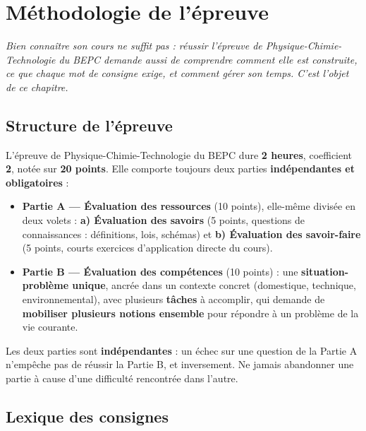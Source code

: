 \chapter{Méthodologie de l'épreuve}

\noindent\textit{Bien connaître son cours ne suffit pas : réussir l'épreuve de
Physique-Chimie-Technologie du BEPC demande aussi de comprendre comment elle est
construite, ce que chaque mot de consigne exige, et comment gérer son temps. C'est l'objet
de ce chapitre.}
\vspace{8pt}

\section{Structure de l'épreuve}

\begin{propriete}
L'épreuve de Physique-Chimie-Technologie du BEPC dure \textbf{2 heures}, coefficient
\textbf{2}, notée sur \textbf{20 points}. Elle comporte toujours deux parties
\textbf{indépendantes et obligatoires} :
\begin{itemize}
\item \textbf{Partie A — Évaluation des ressources} (10 points), elle-même divisée en
deux volets : \textbf{a) Évaluation des savoirs} (5 points, questions de connaissances :
définitions, lois, schémas) et \textbf{b) Évaluation des savoir-faire} (5 points, courts
exercices d'application directe du cours).
\item \textbf{Partie B — Évaluation des compétences} (10 points) : une
\textbf{situation-problème unique}, ancrée dans un contexte concret (domestique,
technique, environnemental), avec plusieurs \textbf{tâches} à accomplir, qui demande de
\textbf{mobiliser plusieurs notions ensemble} pour répondre à un problème de la vie
courante.
\end{itemize}
\end{propriete}

\begin{remarque}
Les deux parties sont \textbf{indépendantes} : un échec sur une question de la Partie A
n'empêche pas de réussir la Partie B, et inversement. Ne jamais abandonner une partie à
cause d'une difficulté rencontrée dans l'autre.
\end{remarque}

\section{Lexique des consignes}

